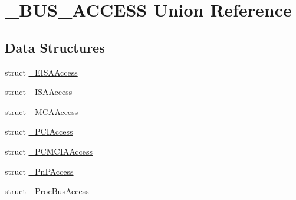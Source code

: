 \hypertarget{union__BUS__ACCESS}{}\section{\+\_\+\+B\+U\+S\+\_\+\+A\+C\+C\+E\+SS Union Reference}
\label{union__BUS__ACCESS}
\subsection*{Data Structures}
\begin{DoxyCompactItemize}
\item 
struct \mbox{\hyperlink{struct__BUS__ACCESS_1_1__EISAAccess}{\+\_\+\+E\+I\+S\+A\+Access}}
\item 
struct \mbox{\hyperlink{struct__BUS__ACCESS_1_1__ISAAccess}{\+\_\+\+I\+S\+A\+Access}}
\item 
struct \mbox{\hyperlink{struct__BUS__ACCESS_1_1__MCAAccess}{\+\_\+\+M\+C\+A\+Access}}
\item 
struct \mbox{\hyperlink{struct__BUS__ACCESS_1_1__PCIAccess}{\+\_\+\+P\+C\+I\+Access}}
\item 
struct \mbox{\hyperlink{struct__BUS__ACCESS_1_1__PCMCIAAccess}{\+\_\+\+P\+C\+M\+C\+I\+A\+Access}}
\item 
struct \mbox{\hyperlink{struct__BUS__ACCESS_1_1__PnPAccess}{\+\_\+\+Pn\+P\+Access}}
\item 
struct \mbox{\hyperlink{struct__BUS__ACCESS_1_1__ProcBusAccess}{\+\_\+\+Proc\+Bus\+Access}}
\end{DoxyCompactItemize}
